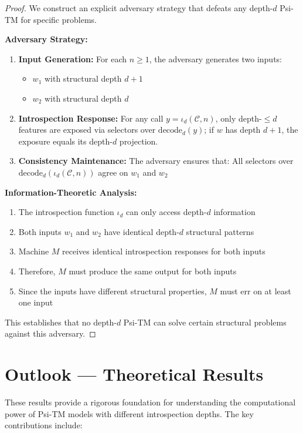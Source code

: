 \begin{proof}
We construct an explicit adversary strategy that defeats any depth-$d$ Psi-TM for specific problems.

\textbf{Adversary Strategy:}
\begin{enumerate}
\item \textbf{Input Generation:} For each $n \geq 1$, the adversary generates two inputs:
  \begin{itemize}
  \item $w_1$ with structural depth $d+1$
  \item $w_2$ with structural depth $d$
  \end{itemize}

\item \textbf{Introspection Response:} For any call $y=\iota_d(\mathcal{C},n)$, only depth-$\le d$ features are exposed via selectors over $\mathrm{decode}_d(y)$; if $w$ has depth $d{+}1$, the exposure equals its depth-$d$ projection.

\item \textbf{Consistency Maintenance:} The adversary ensures that:
All selectors over $\mathrm{decode}_d(\iota_d(\mathcal{C},n))$ agree on $w_1$ and $w_2$
\end{enumerate}

\textbf{Information-Theoretic Analysis:}
\begin{enumerate}
\item The introspection function $\iota_d$ can only access depth-$d$ information
\item Both inputs $w_1$ and $w_2$ have identical depth-$d$ structural patterns
\item Machine $M$ receives identical introspection responses for both inputs
\item Therefore, $M$ must produce the same output for both inputs
\item Since the inputs have different structural properties, $M$ must err on at least one input
\end{enumerate}

This establishes that no depth-$d$ Psi-TM can solve certain structural problems against this adversary.
\end{proof}

\section{Outlook — Theoretical Results}

These results provide a rigorous foundation for understanding the computational power of Psi-TM models with different introspection depths. The key contributions include:

